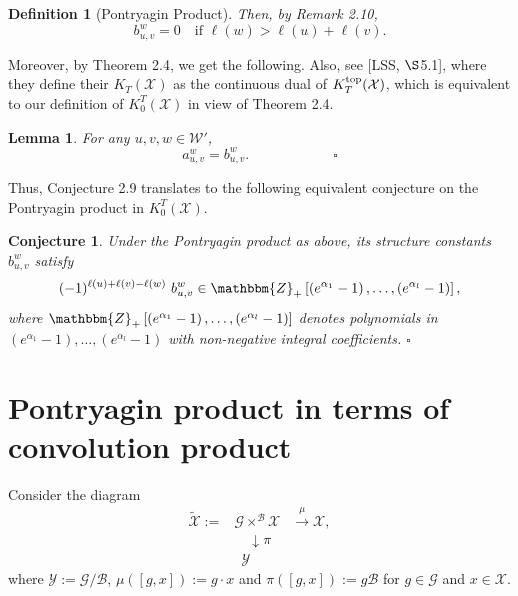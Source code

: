 \documentclass{article}
\newtheorem{definition}[theorem]{Definition}
\newtheorem{lemma}[theorem]{Lemma}
\newtheorem{conjecture}[theorem]{Conjecture}
\def\G{\mathcal{G}}
\def\X{\mathcal{X}}
\def\B{\mathcal{B}}
\def\W{\mathcal{W}}
\def\Y{\mathcal{Y}}
\def\ref#1{#1}
\def\top{\rm{top}}
\begin{document}
\begin{definition}[Pontryagin Product]
{Then, by Remark \ref{2.10},}
 $$
 b_{u,v}^w =0 \quad \mbox{if } \ell(w) > \ell(u) +\ell(v).
 $$
 \end{definition}
 
Moreover, by Theorem \ref{2.4}, we get the following. Also, see [LSS, $\S$5.1], where they define their $K_T(\X)$ as the continuous dual of $K_T^{\top}(\X)$, which is equivalent to our definition of $K^T_0(\X)$ in view of  Theorem \ref{2.4}. 
 \begin{lemma} \label{3.2}
For any $u,v,w\in\W'$, 
$$
a_{u,v}^w = b_{u,v}^w. \qquad \qquad\qquad
\square
$$
  \end{lemma}

Thus, Conjecture \ref{2.9} translates to the following equivalent conjecture on the Pontryagin product in $K_0^T\left({\X}\right)$. 

\begin{conjecture}\label{3.3} Under the Pontryagin product as above, its structure constants $b_{u,v}^w$ satisfy 
$$
(-1)^{ \ell(u)+\ell(v)-\ell(w)}
\,\,b_{u,v}^w \in \mathbbm{Z}_+ \left[\left(e^{\alpha_1}-1\right), \ldots , \left(e^{\alpha_l}-1\right)\right] ,
$$
where $\mathbbm{Z}_+ \left[\left(e^{\alpha_1}-1\right), \ldots , \left(e^{\alpha_l}-1\right)\right]$ denotes polynomials in $\left(e^{\alpha_1}-1\right), \ldots , \left(e^{\alpha_l}-1\right)$ with non-negative integral coefficients.  $\square$
\end{conjecture}


\section{Pontryagin product in terms of convolution product}

Consider the diagram
$$
\begin{array}{lll}
\tilde{\X}:=& \G \times^{\B} \X & \xrightarrow{\mu} \X,\\
&\quad \downarrow \pi&\\
& \,\,\, \Y
\end{array}
$$
where $\Y:=\G/\B$, $\mu([g,x]):=g\cdot x$ and $\pi ([g,x]):= g\B$ for $g\in \G$ and $x\in \X$. 
\end{document}
